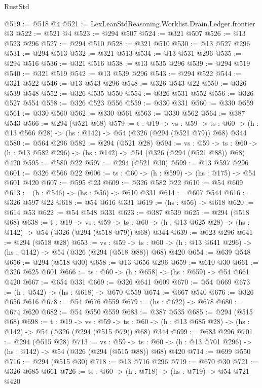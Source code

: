 \begin{lexlean}{RustStd}
\begin{coremodule}
@519 := @518 @4
@521 := LexLeanStdReasoning.Worklist.Drain.Ledger.frontier @3
@522 := @521 @4
@523 := @294 @507
@524 := @321 @507
@526 := @13 @523 @296
@527 := @294 @510
@528 := @321 @510
@530 := @13 @527 @296
@531 := @294 @513
@532 := @321 @513
@534 := @13 @531 @296
@535 := @294 @516
@536 := @321 @516
@538 := @13 @535 @296
@539 := @294 @519
@540 := @321 @519
@542 := @13 @539 @296
@543 := @294 @522
@544 := @321 @522
@546 := @13 @543 @296
@548 := @326 @543 @22
@550 := @326 @539 @548
@552 := @326 @535 @550
@554 := @326 @531 @552
@556 := @326 @527 @554
@558 := @326 @523 @556
@559 := @330 @331
@560 := @330 @559
@561 := @330 @560
@562 := @330 @561
@563 := @330 @562
@564 := @387 @543
@566 := @294 (@521 @68)
@579 := {t : @19} ->
  {vs : @59} ->
  {ts : @60} -> (h : @13 @566 @28) -> (hs : @142) -> @54 (@326 (@294 (@521 @79)) @68) @344
@580 := @564 @296
@582 := @294 (@521 @28)
@594 := {vs : @59} ->
  {ts : @60} -> (h : @13 @582 @296) -> (hs : @142) -> @54 (@326 (@294 (@521 @88)) @68) @420
@595 := @580 @22
@597 := @294 (@521 @30)
@599 := @13 @597 @296
@601 := @326 @566 @22
@606 := {ts : @60} -> (h : @599) -> (hs : @175) -> @54 @601 @420
@607 := @595 @23
@609 := @326 @582 @22
@610 := @54 @609
@613 := (h : @546) -> (hs : @56) -> @610 @331
@614 := @607 @544
@616 := @326 @597 @22
@618 := @54 @616 @331
@619 := (hs : @56) -> @618
@620 := @614 @53
@622 := @54 @548 @331
@623 := @387 @539
@625 := @294 (@518 @68)
@638 := {t : @19} ->
  {vs : @59} ->
  {ts : @60} -> (h : @13 @625 @28) -> (hs : @142) -> @54 (@326 (@294 (@518 @79)) @68) @344
@639 := @623 @296
@641 := @294 (@518 @28)
@653 := {vs : @59} ->
  {ts : @60} -> (h : @13 @641 @296) -> (hs : @142) -> @54 (@326 (@294 (@518 @88)) @68) @420
@654 := @639 @548
@656 := @294 (@518 @30)
@658 := @13 @656 @296
@659 := @610 @30
@661 := @326 @625 @601
@666 := {ts : @60} -> (h : @658) -> (hs : @659) -> @54 @661 @420
@667 := @654 @331
@669 := @326 @641 @609
@670 := @54 @669
@673 := (h : @542) -> (hs : @618) -> @670 @559
@674 := @667 @540
@676 := @326 @656 @616
@678 := @54 @676 @559
@679 := (hs : @622) -> @678
@680 := @674 @620
@682 := @54 @550 @559
@683 := @387 @535
@685 := @294 (@515 @68)
@698 := {t : @19} ->
  {vs : @59} ->
  {ts : @60} -> (h : @13 @685 @28) -> (hs : @142) -> @54 (@326 (@294 (@515 @79)) @68) @344
@699 := @683 @296
@701 := @294 (@515 @28)
@713 := {vs : @59} ->
  {ts : @60} -> (h : @13 @701 @296) -> (hs : @142) -> @54 (@326 (@294 (@515 @88)) @68) @420
@714 := @699 @550
@716 := @294 (@515 @30)
@718 := @13 @716 @296
@719 := @670 @30
@721 := @326 @685 @661
@726 := {ts : @60} -> (h : @718) -> (hs : @719) -> @54 @721 @420

\end{coremodule}
\end{lexlean}
